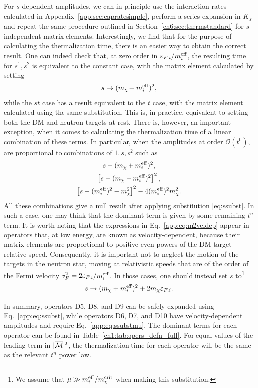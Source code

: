  For $s$-dependent amplitudes, we can in principle use the interaction rates calculated in Appendix~\ref{app:sec:capratesimple}, perform a series expansion in $K_\chi$  and repeat the same procedure outlined in Section~\ref{ch6:sec:thermstandard} for $s$-independent matrix elements. Interestingly, we find that for the purpose of calculating the thermalization time, there is an easier way to obtain the correct result. One can indeed check that, at zero order in $\varepsilon_{F,i}/m_i^{\rm eff}$, the resulting time for $s^1, s^2$ is equivalent to the constant case, with the matrix element calculated by setting 
\begin{equation}
    s\rightarrow (m_\chi+m_i^{\rm eff})^2,
    \label{app:eq:ssubst}
\end{equation}
while the $s t $ case has a result equivalent to the $t$ case, with the matrix element calculated using the same substitution. This is, in practice, equivalent to setting both the DM and neutron targets at rest. There is, however, an important exception, when it comes to calculating the thermalization time of a linear combination of these terms. In particular, when the amplitudes at order $\mathcal{O}(t^0)$, are proportional to combinations of $1,s,s^2$ such as
\begin{gather}
s-(m_\chi+m_i^{\rm eff})^2,\nonumber\\
\left[s-(m_\chi+m_i^{\rm eff})^2\right]^2,\nonumber\\
\left[s-(m_i^{\rm eff})^2-m_\chi^2\right]^2-4(m_i^{\rm eff})^2 m_\chi^2.\label{app:eq:m2veldep}
\end{gather}
All these combinations give a null result after applying substitution \ref{eq:ssubst}. In such a case, one may think that the dominant term is given by some remaining $t^n$ term. It is worth noting that the expressions in  Eq.~\ref{app:eq:m2veldep}  appear in operators that, at low energy, are known as velocity-dependent, because their matrix elements are proportional to positive even powers of the DM-target relative speed. Consequently, it is important not to neglect the motion of the targets in the neutron star, moving at relativistic speeds that are of the order of the Fermi velocity $v_F^2=2\varepsilon_{F,i}/m_i^{\rm eff}$. In those cases, one should instead set $s$ to\footnote{We assume that $\mu\gg m_i^{\rm eff}/m_\chi^{\rm crit}$ when making this substitution.}
\begin{equation}
    s\rightarrow (m_\chi+m_i^{\rm eff})^2+2m_\chi\varepsilon_{F,i}.
    \label{app:eq:ssubstmu}
\end{equation}


In summary, operators D5, D8, and D9 can be safely expanded using Eq.~\ref{app:eq:ssubst}, while operators D6, D7, and D10 have velocity-dependent amplitudes and require Eq.~\ref{app:eq:ssubstmu}. 
The dominant terms for each operator can be found in Table~\ref{ch1:tab:opers_defn_full}. 
For equal values of the leading term in $|\overline{\mathcal M}|^2$, the thermalization time for each operator will be the same as the relevant $t^n$ power law. 


